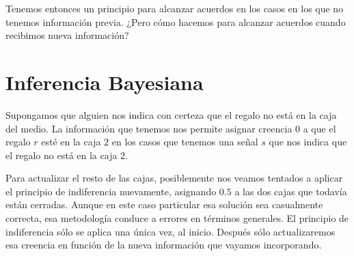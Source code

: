 \documentclass[a4paper,10pt]{book}
\theoremstyle{definition}
\begin{document}

Tenemos entonces un principio para alcanzar acuerdos en los casos en los que no tenemos información previa.
¿Pero cómo hacemos para alcanzar acuerdos cuando recibimos nueva información?

\section{Inferencia Bayesiana}

Supongamos que alguien nos indica con certeza que el regalo no está en la caja del medio.
La información que tenemos nos permite asignar creencia 0 a que el regalo $r$ esté en la caja $2$ en los casos que tenemos una señal $s$ que nos indica que el regalo no está en la caja $2$.
%
\begin{figure}[H]
\centering
{} 
\caption{}
\end{figure}
%
Para actualizar el resto de las cajas, posiblemente nos veamos tentados a aplicar el principio de indiferencia nuevamente, asignando $0.5$ a las dos cajas que todavía están cerradas.
%
Aunque en este caso particular esa solución sea casualmente correcta, esa metodología conduce a errores en términos generales.
%
El principio de indiferencia sólo se aplica una única vez, al inicio.
%
Después sólo actualizaremos esa creencia en función de la nueva información que vayamos incorporando.

\end{document}

